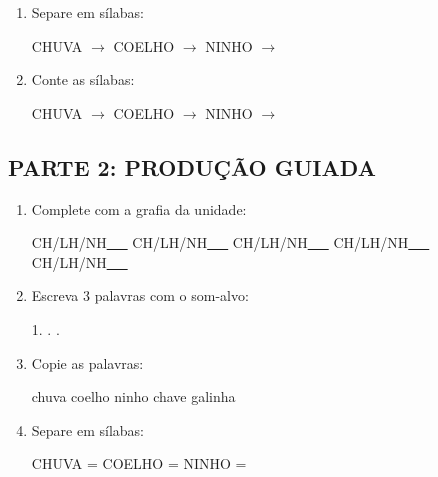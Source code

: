 \begin{exercicio}
\begin{enumerate}
  \item Separe em sílabas:
  \begin{center}
  CHUVA $\rightarrow$ \underline{\hspace{1cm}} \quad COELHO $\rightarrow$ \underline{\hspace{1cm}} \quad NINHO $\rightarrow$ \underline{\hspace{1cm}}
  \end{center}

  \item Conte as sílabas:
  \begin{center}
  CHUVA $\rightarrow$ \underline{\hspace{0.9cm}} \quad COELHO $\rightarrow$ \underline{\hspace{0.9cm}} \quad NINHO $\rightarrow$ \underline{\hspace{0.9cm}}
  \end{center}

\end{enumerate}

\subsection*{PARTE 2: PRODUÇÃO GUIADA}

\begin{enumerate}[resume]

  \item Complete com a grafia da unidade:
  \begin{center}
  CH/LH/NH\underline{~~~} \quad CH/LH/NH\underline{~~~} \quad CH/LH/NH\underline{~~~} \quad CH/LH/NH\underline{~~~} \quad CH/LH/NH\underline{~~~}
  \end{center}

  \item Escreva 3 palavras com o som-alvo:
  \begin{center}
  1. \underline{\hspace{3cm}} . \underline{\hspace{3cm}} . \underline{\hspace{3cm}}
  \end{center}

  \item Copie as palavras:
  \begin{center}
  chuva \quad coelho \quad ninho \quad chave \quad galinha
  \end{center}

  \item Separe em sílabas:
  \begin{center}
  CHUVA = \underline{\hspace{1cm}} \underline{\hspace{1cm}} \quad COELHO = \underline{\hspace{1cm}} \underline{\hspace{1cm}} \quad NINHO = \underline{\hspace{1cm}} \underline{\hspace{1cm}}
  \end{center}


\end{enumerate}
\end{exercicio}
